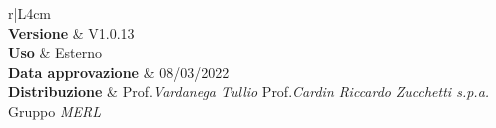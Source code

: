 \begin{center}
	\begin{tabular}{r|L{4cm}}
			 \\
			\hline
			\textbf{Versione}			& V1.0.13 \\
			\textbf{Uso}		& Esterno \\
			\textbf{Data approvazione} 			& 08/03/2022 \\
			\textbf{Distribuzione} 	&	Prof.\textit{Vardanega Tullio} \newline Prof.\textit{Cardin Riccardo} \newline \textit{Zucchetti s.p.a.} \newline Gruppo \textit{MERL} \\
	\end{tabular}
\end{center}
